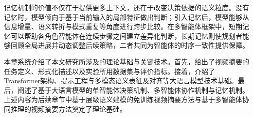 记忆机制的价值不仅在于提供更多上下文，还在于改变决策依据的语义粒度。没有记忆时，模型倾向于基于当前输入的局部特征做出判断；引入记忆后，模型能够从信息增量、语义转折与模式重复等角度进行跨步比较。在多智能体框架中，短期记忆可以帮助各角色智能体在连续步骤之间建立差异化判断，长期记忆则使规划者能够回顾全局进展并动态调整后续策略，二者共同为智能体的时序一致性提供保障。


本章系统介绍了本文研究所涉及的理论基础与关键技术。首先，给出了视频摘要的任务定义、形式化描述以及实验所用数据集与评价指标。接着，介绍了Transformer架构、提示工程与多模态语义表征及对齐等大语言模型技术基础。最后，阐述了基于大语言模型的单智能体决策机制、多智能体协作机制与记忆机制。上述内容为后续章节中基于层级语义建模的免训练视频摘要方法与基于多智能体协同推理的视频摘要方法奠定了理论基础。
